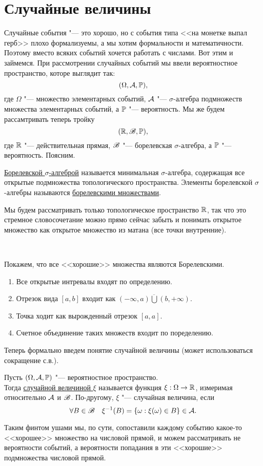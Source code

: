 \documentclass[../TV&MS.tex]{subfiles}
\begin{document}
    
\section{Случайные величины}

\qquad Случайные события "--- это хорошо, но с события типа <<на монетке выпал герб>> плохо формализуемы, а мы хотим формальности и математичности. Поэтому вместо всяких событий хочется работать с числами. Вот этим и займемся. При рассмотрении случайных событий мы ввели вероятностное пространство, которе выглядит так:
$$(\Omega, \mathcal{A}, \mathbb{P}),$$
где $\Omega$ "--- множество элементарных событий, $\mathcal{A}$ "--- $\sigma$-алгебра подмножеств множества элементарных событий, а $\mathbb{P}$ "--- вероятность. Мы же будем рассамтривать теперь тройку
$$(\mathbb{R}, \mathscr{B}, \mathbb{P}),$$
где $\mathbb{R}$ "--- действительная прямая, $\mathscr{B}$ "--- борелевская $\sigma$-алгебра, а $\mathbb{P}$ "--- вероятность. Поясним.

\begin{Def}
\underline{Борелевской $\sigma$-алгеброй} называется минимальная $\sigma$-алгебра, содержащая все открытые подмножества топологического пространства. Элементы борелевской $\sigma$-алгебры называются \underline{борелевскими множествами}.
\end{Def}
\begin{Wtf}
Мы будем рассматривать только топологическое пространство $\mathbb{R}$, так что это стремное словосочетание можно прямо 
сейчас забыть и понимать открытое множество как открытое множество из матана (все точки внутренние).
\end{Wtf}\\
\begin{Ex}
Покажем, что все <<хорошие>> множества являются Борелевскими.
\begin{enumerate}
\item Все открытые интревалы входят по определению.
\item Отрезок вида $[a, b]$ входит как $\overline{(-\infty, a) \bigcup (b, +\infty)}$.
\item Точка ходит как вырожденный отрезок $[a, a]$.
\item Счетное объединение таких множеств входит по поределению.
\end{enumerate}
\end{Ex}

Теперь формально введем понятие случайной величины (может использоваться сокращение с.в.).

\begin{Def}
Пусть $(\Omega, \mathcal{A}, \mathbb{P})$ "--- вероятностное пространство.\\ Тогда \underline{случайной величиной $\xi$} называется функция $\xi : \Omega \to \mathbb{R}$, измеримая относительно $\mathcal{A}$ и $\mathscr{B}$. По-другому, $\xi$ "--- случайная величина, если
$$\forall B \in \mathscr{B} \quad \xi^{-1}(B) = \lbrace \omega : \xi(\omega) \in B \rbrace \in \mathcal{A}.$$
\end{Def}
\begin{Wtf}
Таким финтом ушами мы, по сути, сопоставили каждому событию какое-то <<хорошее>> множество на числовой прямой, и можем рассматривать не вероятности событий, а вероятности попадания в эти <<хорошие>> подмножества числовой прямой.
\end{Wtf}
\end{document}
